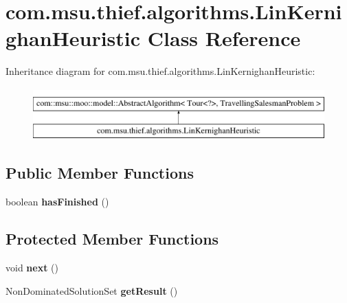 \hypertarget{classcom_1_1msu_1_1thief_1_1algorithms_1_1LinKernighanHeuristic}{\section{com.\-msu.\-thief.\-algorithms.\-Lin\-Kernighan\-Heuristic Class Reference}
\label{classcom_1_1msu_1_1thief_1_1algorithms_1_1LinKernighanHeuristic}
}
Inheritance diagram for com.\-msu.\-thief.\-algorithms.\-Lin\-Kernighan\-Heuristic\-:\begin{figure}[H]
\begin{center}
\leavevmode
\includegraphics[height=2.000000cm]{classcom_1_1msu_1_1thief_1_1algorithms_1_1LinKernighanHeuristic}
\end{center}
\end{figure}
\subsection*{Public Member Functions}
\begin{DoxyCompactItemize}
\item 
\hypertarget{classcom_1_1msu_1_1thief_1_1algorithms_1_1LinKernighanHeuristic_ae3ac277ba720e435374f5f0172634295}{boolean {\bfseries has\-Finished} ()}\label{classcom_1_1msu_1_1thief_1_1algorithms_1_1LinKernighanHeuristic_ae3ac277ba720e435374f5f0172634295}

\end{DoxyCompactItemize}
\subsection*{Protected Member Functions}
\begin{DoxyCompactItemize}
\item 
\hypertarget{classcom_1_1msu_1_1thief_1_1algorithms_1_1LinKernighanHeuristic_aef8fbed61bf6ab11bf5d8522b8ed401b}{void {\bfseries next} ()}\label{classcom_1_1msu_1_1thief_1_1algorithms_1_1LinKernighanHeuristic_aef8fbed61bf6ab11bf5d8522b8ed401b}

\item 
\hypertarget{classcom_1_1msu_1_1thief_1_1algorithms_1_1LinKernighanHeuristic_ab00c3b797dd4722cf682f05ead593661}{Non\-Dominated\-Solution\-Set {\bfseries get\-Result} ()}\label{classcom_1_1msu_1_1thief_1_1algorithms_1_1LinKernighanHeuristic_ab00c3b797dd4722cf682f05ead593661}

\end{DoxyCompactItemize}

